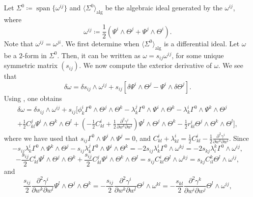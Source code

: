 \documentclass[11pt]{article}
\theoremstyle{plain}
\theoremstyle{definition}
\DeclareMathOperator\spn{span} %
\begin{document}
Let $\Sigma^0\coloneqq \spn\{\omega^{ij}\}$ and $\langle \Sigma^0\rangle_{\mathrm{alg}}$ be the algebraic ideal generated by the $\omega^{ij}$, where
\begin{equation*}
    \omega^{ij}\coloneqq \frac{1}{2}\left(\Psi^i\wedge \Theta^j+\Psi^j\wedge \Theta^i\right).
\end{equation*}
Note that $\omega^{ij}=\omega^{ji}$. We first determine when $\langle \Sigma^0\rangle_{\mathrm{alg}}$ is a differential ideal. Let $\omega$ be a $2$-form in $\Sigma^0$. Then, it can be written as $\omega=s_{ij}\omega^{ij}$, for some unique symmetric matrix $(s_{ij})$. We now compute the exterior derivative of $\omega$. We see that
\begin{equation*}
    \delta \omega=\delta s_{ij}\wedge \omega^{ij}+s_{ij}\left[\delta \Psi^i\wedge \Theta^j-\Psi^i\wedge \delta \Theta^j\right].
\end{equation*}
Using , one obtains
\begin{multline*}
    \delta \omega=\delta s_{ij}\wedge \omega^{ij}+s_{ij}\Bigg[\phi_k^i \Gamma^0\wedge \Theta^j\wedge \Theta^k-\lambda_k^j \Gamma^0\wedge \Psi^i\wedge \Theta^k-\lambda_k^i \Gamma^0\wedge \Psi^k\wedge \Theta^j\\+\frac{1}{2}C_{kl}^j \Psi^i\wedge \Theta^k\wedge \Theta^l+\left(-\frac{1}{2}C_{kl}^i+\frac{1}{2}\frac{\partial^2 \gamma^i}{\partial w^k \partial w^l}\right)\Psi^l\wedge \Theta^j\wedge \Theta^k-\frac{1}{2}r_{kl}^i\Theta^j\wedge \Theta^k\wedge \Theta^l\Bigg],
\end{multline*}
where we have used that $s_{ij} \Gamma^0\wedge \Psi^i\wedge \Psi^j=0$, and $C_{kl}^i+\lambda_{kl}^i=\frac{1}{2}C_{kl}^i-\frac{1}{2}\frac{\partial^2 \gamma^i}{\partial w^k \partial w^l}$. Since
\begin{equation*}
    -s_{ij}\lambda_k^i \Gamma^0\wedge \Psi^k\wedge \Theta^j-s_{ij}\lambda_k^j \Gamma^0\wedge \Psi^i\wedge \Theta^k=-2s_{ij}\lambda_k^i \Gamma^0\wedge \omega^{kj}=-2s_{kj}\lambda_i^k \Gamma^0\wedge \omega^{ij},
\end{equation*}
\begin{equation*}
    -\frac{s_{ij}}{2}C_{kl}^i \Psi^l\wedge \Theta^j\wedge \Theta^k+\frac{s_{ij}}{2}C_{kl}^j \Psi^i\wedge \Theta^k\wedge \Theta^l=s_{ij}C_{kl}^i \Theta^l\wedge \omega^{kj}=s_{kj}C_{il}^k \Theta^l\wedge \omega^{ij},
\end{equation*}
and
\begin{equation*}
    \frac{s_{ij}}{2}\frac{\partial^2 \gamma^i}{\partial w^k \partial w^l} \Psi^l\wedge \Theta^j\wedge \Theta^k=-\frac{s_{ij}}{2}\frac{\partial^2 \gamma^i}{\partial w^k \partial w^l} \Theta^j\wedge \omega^{kl}=-\frac{s_{kl}}{2}\frac{\partial^2 \gamma^k}{\partial w^i \partial w^j}\Theta^l\wedge \omega^{ij},
\end{equation*}
\end{document}
